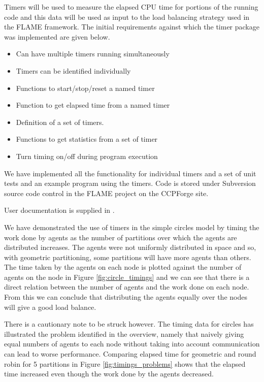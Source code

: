 \label{app:timer-package}
Timers will be used to measure the elapsed CPU time for portions of the running code and this data will be used as input to the load balancing strategy used in the FLAME framework. The initial requirements against which the timer package was implemented are given below.

\begin{itemize}
\item Can have multiple timers running simultaneously
\item Timers can be identified individually
\item Functions to start/stop/reset a named timer
\item Function to get elapsed time from a named timer
\item Definition of a set of timers.
\item Functions to get statistics from a set of timer
\item Turn timing on/off during program execution 
\end{itemize}

We have implemented all the functionality for individual timers and a set of unit tests and an example program using the timers. Code is stored under Subversion source code control in the FLAME project on the CCPForge site. 

User documentation is supplied in \cite{TimerAPI}.

We have demonstrated the use of timers in the simple circles model by timing the work done by agents as the number of partitions over which the agents are distributed increases. The agents were not uniformly distributed in space and so, with geometric partitioning, some partitions will have more agents than others. The time taken by the agents on each node is plotted against the number of agents on the node in Figure \ref{fig:circle_timings} and we can see that there is a direct relation between the number of agents and the work done on each node. From this we can conclude that distributing the agents equally over the nodes will give a good load balance.

There is a cautionary note to be struck however. The timing data for circles has illustrated the problem identified in the overview, namely that naively giving equal numbers of agents to each node without taking into account communication can lead to worse performance. Comparing elapsed time for geometric and round robin for 5 partitions in Figure \ref{fig:timings_problems} shows that the elapsed time increased even though the work done by the agents decreased.

